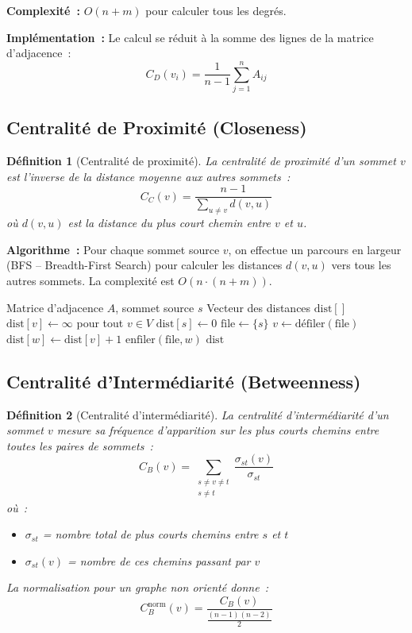 \documentclass[12pt,a4paper]{article}
\newtheorem{definition}{Définition}[section]
\begin{document}
\textbf{Complexité~:} $O(n + m)$ pour calculer tous les degrés.

\textbf{Implémentation~:} Le calcul se réduit à la somme des lignes de la matrice d'adjacence~:
\[
    C_D(v_i) = \frac{1}{n-1} \sum_{j=1}^{n} A_{ij}
\]

\subsection{Centralité de Proximité (Closeness)}

\begin{definition}[Centralité de proximité]
La \emph{centralité de proximité} d'un sommet $v$ est l'inverse de la distance moyenne aux autres sommets~:
\[
    C_C(v) = \frac{n - 1}{\sum_{u \neq v} d(v, u)}
\]
où $d(v, u)$ est la distance du plus court chemin entre $v$ et $u$.
\end{definition}

\textbf{Algorithme~:} Pour chaque sommet source $v$, on effectue un parcours en largeur (BFS -- Breadth-First Search) pour calculer les distances $d(v, u)$ vers tous les autres sommets. La complexité est $O(n \cdot (n + m))$.

\begin{algorithm}[H]
\caption{BFS pour le calcul des distances}
\begin{algorithmic}[1]
\Require Matrice d'adjacence $A$, sommet source $s$
\Ensure Vecteur des distances $\text{dist}[]$
\State $\text{dist}[v] \leftarrow \infty$ pour tout $v \in V$
\State $\text{dist}[s] \leftarrow 0$
\State $\text{file} \leftarrow \{s\}$
    \State $v \leftarrow \text{d\'{e}filer}(\text{file})$
            \State $\text{dist}[w] \leftarrow \text{dist}[v] + 1$
            \State $\text{enfiler}(\text{file}, w)$
        \EndIf
    \EndFor
\EndWhile
\State \Return $\text{dist}$
\end{algorithmic}
\end{algorithm}

\subsection{Centralité d'Intermédiarité (Betweenness)}

\begin{definition}[Centralité d'intermédiarité]
La \emph{centralité d'intermédiarité} d'un sommet $v$ mesure sa fréquence d'apparition sur les plus courts chemins entre toutes les paires de sommets~:
\[
    C_B(v) = \sum_{\substack{s \neq v \neq t \\ s \neq t}} \frac{\sigma_{st}(v)}{\sigma_{st}}
\]
où~:
\begin{itemize}
    \item $\sigma_{st}$ = nombre total de plus courts chemins entre $s$ et $t$
    \item $\sigma_{st}(v)$ = nombre de ces chemins passant par $v$
\end{itemize}

La normalisation pour un graphe non orienté donne~:
\[
    C_B^{\text{norm}}(v) = \frac{C_B(v)}{\frac{(n-1)(n-2)}{2}}
\]
\end{definition}
\end{document}
